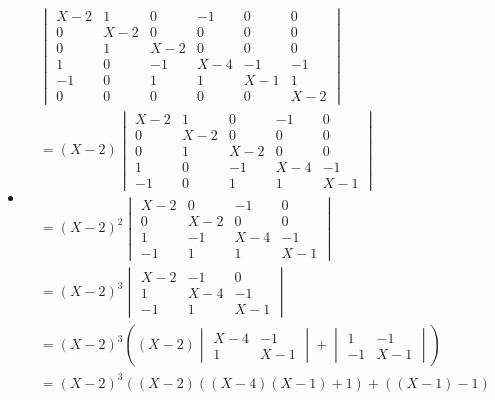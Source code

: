 \documentclass[main.tex]{subfiles}
\begin{document}
\begin{itemize}
  \begin{itemize}
  \item
    \[
    \begin{array}{l}
      \begin{vmatrix}
        X-2 & 1 & 0 & -1 & 0 & 0\\
        0 & X-2 & 0 & 0 & 0 & 0\\
        0 & 1 & X-2 & 0 & 0 & 0\\
        1 & 0 & -1 & X-4 & -1 & -1\\
        -1 & 0 & 1 & 1 & X-1 & 1\\
        0 & 0 & 0 & 0 & 0 & X-2
      \end{vmatrix}\\
      =
      (X-2)
      \begin{vmatrix}
        X-2 & 1 & 0 & -1 & 0\\
        0 & X-2 & 0 & 0 & 0\\
        0 & 1 & X-2 & 0 & 0\\
        1 & 0 & -1 & X-4 & -1\\
        -1 & 0 & 1 & 1 & X-1
      \end{vmatrix}\\
      =
      (X-2)^{2}
      \begin{vmatrix}
        X-2 & 0 & -1 & 0\\
        0 & X-2 & 0 & 0\\
        1 & -1 & X-4 & -1\\
        -1 & 1 & 1 & X-1
      \end{vmatrix}\\
      =
      (X-2)^{3}
      \begin{vmatrix}
        X-2 & -1 & 0\\
        1 & X-4 & -1\\
        -1 & 1 & X-1
      \end{vmatrix}\\
      =
      (X-2)^{3}
      \left(
        (X-2)
        \begin{vmatrix}
          X-4 & -1\\
          1 & X-1
        \end{vmatrix}
        +
        \begin{vmatrix}
          1 & -1\\
          -1 & X-1
        \end{vmatrix}
      \right)\\
      =
      (X-2)^{3}
      \left(
        (X-2)\left((X-4)(X-1) +1\right)
        + ((X-1)-1)

\end{array}\]
\end{itemize}
\end{itemize}
\end{document}
